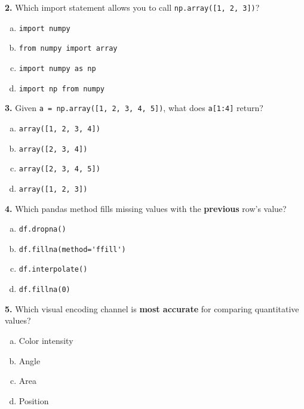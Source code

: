 \documentclass[11pt,a4paper]{article}
\begin{document}
\vspace{0.3cm}

\noindent\textbf{2.} Which import statement allows you to call \lstinline{np.array([1, 2, 3])}?
\begin{enumerate}[(a)]
\item \lstinline{import numpy}
\item \lstinline{from numpy import array}
\item \lstinline{import numpy as np}
\item \lstinline{import np from numpy}
\end{enumerate}

\vspace{0.3cm}

\noindent\textbf{3.} Given \lstinline{a = np.array([1, 2, 3, 4, 5])}, what does \lstinline{a[1:4]} return?
\begin{enumerate}[(a)]
\item \lstinline{array([1, 2, 3, 4])}
\item \lstinline{array([2, 3, 4])}
\item \lstinline{array([2, 3, 4, 5])}
\item \lstinline{array([1, 2, 3])}
\end{enumerate}

\vspace{0.3cm}

\noindent\textbf{4.} Which pandas method fills missing values with the \textbf{previous} row's value?
\begin{enumerate}[(a)]
\item \lstinline{df.dropna()}
\item \lstinline{df.fillna(method='ffill')}
\item \lstinline{df.interpolate()}
\item \lstinline{df.fillna(0)}
\end{enumerate}

\vspace{0.3cm}

\noindent\textbf{5.} Which visual encoding channel is \textbf{most accurate} for comparing quantitative values?
\begin{enumerate}[(a)]
\item Color intensity
\item Angle
\item Area
\item Position
\end{enumerate}

\newpage
\end{document}
